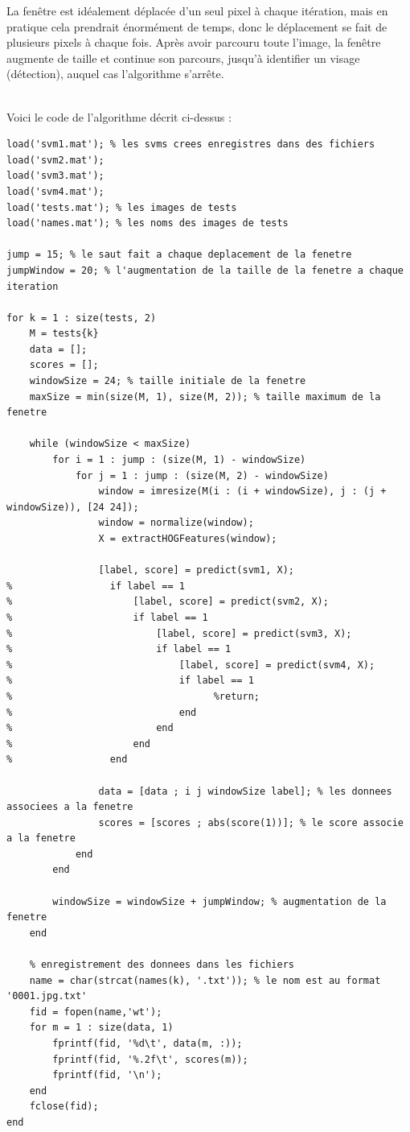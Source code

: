 \documentclass[11pt]{report}
\begin{document}
La fenêtre est idéalement déplacée d'un seul pixel à chaque itération, mais en pratique cela prendrait énormément de temps, donc le déplacement se fait de plusieurs pixels à chaque fois. Après avoir parcouru toute l'image, la fenêtre augmente de taille et continue son parcours, jusqu'à identifier un visage (détection), auquel cas l'algorithme s'arrête.

~\\
Voici le code de l'algorithme décrit ci-dessus :

\begin{lstlisting}
load('svm1.mat'); % les svms crees enregistres dans des fichiers
load('svm2.mat');
load('svm3.mat');
load('svm4.mat');
load('tests.mat'); % les images de tests
load('names.mat'); % les noms des images de tests

jump = 15; % le saut fait a chaque deplacement de la fenetre
jumpWindow = 20; % l'augmentation de la taille de la fenetre a chaque iteration

for k = 1 : size(tests, 2)
    M = tests{k}
    data = [];
    scores = [];
    windowSize = 24; % taille initiale de la fenetre
    maxSize = min(size(M, 1), size(M, 2)); % taille maximum de la fenetre
    
    while (windowSize < maxSize)
        for i = 1 : jump : (size(M, 1) - windowSize)
            for j = 1 : jump : (size(M, 2) - windowSize)
                window = imresize(M(i : (i + windowSize), j : (j + windowSize)), [24 24]); 
                window = normalize(window); 								
                X = extractHOGFeatures(window);

                [label, score] = predict(svm1, X);
%                 if label == 1
%                     [label, score] = predict(svm2, X);
%                     if label == 1
%                         [label, score] = predict(svm3, X);
%                         if label == 1
%                             [label, score] = predict(svm4, X);
%                             if label == 1
%                            		%return;
%                             end
%                         end
%                     end
%                 end

                data = [data ; i j windowSize label]; % les donnees associees a la fenetre
                scores = [scores ; abs(score(1))]; % le score associe a la fenetre
            end
        end

        windowSize = windowSize + jumpWindow; % augmentation de la fenetre
    end
    
    % enregistrement des donnees dans les fichiers
    name = char(strcat(names(k), '.txt')); % le nom est au format '0001.jpg.txt'
    fid = fopen(name,'wt');
    for m = 1 : size(data, 1)
        fprintf(fid, '%d\t', data(m, :));
        fprintf(fid, '%.2f\t', scores(m));
        fprintf(fid, '\n');
    end
    fclose(fid);
end
\end{lstlisting}
\end{document}

